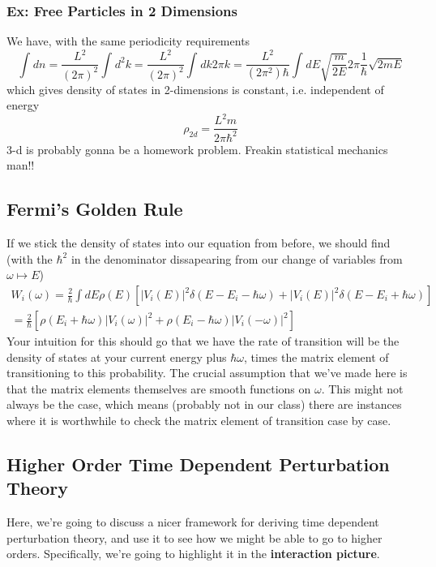 \documentclass{article}
\theoremstyle{definition}
\begin{document}
\subsubsection{Ex: Free Particles in 2 Dimensions}
We have, with the same periodicity requirements
\begin{equation}
	\int_{}^{}dn=\frac{L^2}{(2\pi)^2}\int_{}^{}d^2k=\frac{L^2}{(2\pi)^2}\int_{}^{}dk2\pi k
	=\frac{L^2}{(2\pi^2)\hbar}\int_{}^{}dE\sqrt{\frac{m}{2E}}2\pi\frac{1}{\hbar}\sqrt{2mE}
\end{equation}
which gives density of states in 2-dimensions is constant, i.e. independent of energy
\begin{equation}
	\rho_{2d}=\frac{L^2m}{2\pi\hbar^2}
\end{equation}
3-d is probably gonna be a homework problem. Freakin statistical mechanics man!!

\subsection{Fermi's Golden Rule}
If we stick the density of states into our equation from before, we should find (with the $\hbar^2$ in the denominator dissapearing from our change of variables from $\omega\mapsto E$)
\begin{align}
	W_i(\omega)=\frac{2}{\hbar}\int dE\rho(E)\left[
		|V_i(E)|^2\delta(E-E_i-\hbar\omega)+|V_i(E)|^2\delta(E-E_i+\hbar\omega)
		\right]
		\\
	=\frac{2}{\hbar}\left[
		\rho(E_i+\hbar\omega)|V_i(\omega)|^2+\rho(E_i-\hbar\omega)|V_i(-\omega)|^2
		\right]
\end{align}
Your intuition for this should go that we have the rate of transition will be the density of states at your current energy plus $\hbar\omega$, times the matrix element of transitioning to this probability.
The crucial assumption that we've made here is that the matrix elements themselves are smooth functions on $\omega$.  This might not always be the case, which means (probably not in our class) there are instances where it is worthwhile to check the matrix element of transition case by case.

\subsection{Higher Order Time Dependent Perturbation Theory}
Here, we're going to discuss a nicer framework for deriving time dependent perturbation theory, and use it to see how we might be able to go to higher orders. 
Specifically, we're going to highlight it in the \textbf{interaction picture}.
\end{document}
